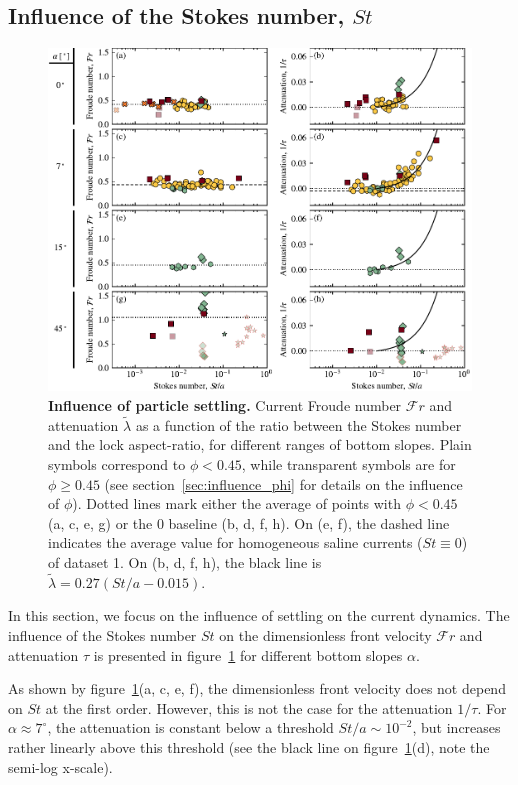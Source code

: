 \documentclass[twocolumn]{article}
\begin{document}
\subsection{Influence of the Stokes number, $St$}
\label{sec:influence_stokes}

\begin{figure}[ht]
	\centering
	\includegraphics{figure5.pdf}
	\caption{\textbf{Influence of particle settling.} Current Froude number $\mathcal{F}r$ and attenuation $\tilde{\lambda}$ as a function of the ratio between the Stokes number and the lock aspect-ratio, for different ranges of bottom slopes. Plain symbols correspond to $\phi < 0.45$, while transparent symbols are for $\phi \geq 0.45$ (see section~\ref{sec:influence_phi} for details on the influence of $\phi$). Dotted lines mark either the average of points with $\phi < 0.45$ (a, c, e, g) or the 0 baseline (b, d, f, h). On (e, f), the dashed line indicates the average value for homogeneous saline currents ($St \equiv 0$) of dataset 1. On (b, d, f, h), the black line is $\tilde{\lambda} = 0.27 (St/a - 0.015)$.}
	\label{fig:fig5}
\end{figure}

In this section, we focus on the influence of settling on the current dynamics. The influence of the Stokes number $St$ on the dimensionless front velocity $\mathcal{F}r$ and attenuation $\tau$ is presented in figure~\ref{fig:fig5} for different bottom slopes $\alpha$.

As shown by figure~\ref{fig:fig5}(a, c, e, f), the dimensionless front velocity does not depend on $St$ at the first order. However, this is not the case for the attenuation $1/\tau$. For $\alpha \approx 7^\circ$, the attenuation is constant below a threshold $St/a \sim 10^{-2}$, but increases rather linearly above this threshold (see the black line on figure~\ref{fig:fig5}(d), note the semi-log x-scale).
\end{document}
